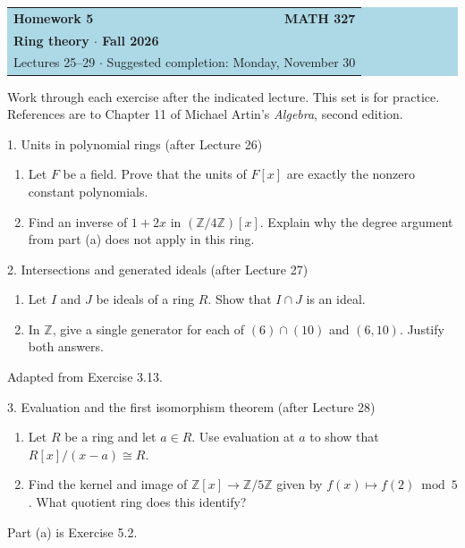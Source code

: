 \documentclass[11pt]{article}
\newcommand{\Z}{\mathbb{Z}}
\begin{document}
\begin{center}
  \colorbox{lightblue}{%
    \begin{minipage}{0.92\textwidth}
      \vspace{0.6em}
      \begin{tabular*}{\textwidth}{@{\extracolsep{\fill}}lr}
        {\color{courseblue}\bfseries\LARGE Homework 5} &
        {\color{courseblue}\bfseries\LARGE MATH 327}\\[0.4em]
        \multicolumn{2}{l}{\color{darkgray}\bfseries Ring theory $\cdot$ Fall 2026}\\[0.35em]
        \multicolumn{2}{l}{\color{darkgray}Lectures 25--29 $\cdot$ Suggested completion: Monday, November 30}
      \end{tabular*}
      \vspace{0.5em}
    \end{minipage}}
\end{center}

Work through each exercise after the indicated lecture. This set is for
practice. References are to Chapter 11 of Michael Artin's \emph{Algebra},
second edition.

\begin{exercise}{1. Units in polynomial rings (after Lecture 26)}
\begin{enumerate}[label=\textbf{(\alph*)}]
  \item Let $F$ be a field. Prove that the units of $F[x]$ are exactly the
        nonzero constant polynomials.
  \item Find an inverse of $1+2x$ in $(\Z/4\Z)[x]$. Explain why the degree
        argument from part (a) does not apply in this ring.
\end{enumerate}
\end{exercise}

\begin{exercise}{2. Intersections and generated ideals (after Lecture 27)}
\begin{enumerate}[label=\textbf{(\alph*)}]
  \item Let $I$ and $J$ be ideals of a ring $R$. Show that $I\cap J$ is an ideal.
  \item In $\Z$, give a single generator for each of $(6)\cap(10)$ and
        $(6,10)$. Justify both answers.
\end{enumerate}
{\small\color{darkgray}Adapted from Exercise 3.13.}
\end{exercise}

\begin{exercise}{3. Evaluation and the first isomorphism theorem (after Lecture 28)}
\begin{enumerate}[label=\textbf{(\alph*)}]
  \item Let $R$ be a ring and let $a\in R$. Use evaluation at $a$ to show
        that $R[x]/(x-a)\cong R$.
  \item Find the kernel and image of $\Z[x]\to\Z/5\Z$ given by
        $f(x)\mapsto f(2)\bmod 5$. What quotient ring does this identify?
\end{enumerate}
{\small\color{darkgray}Part (a) is Exercise 5.2.}
\end{exercise}
\end{document}
